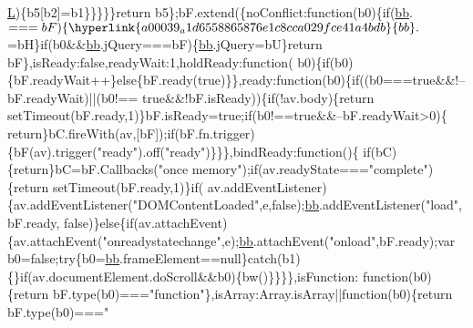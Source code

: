 \begin{DoxyCode}
      \hyperlink{a00039_a38ee4c0b5f4fe2a18d0c783af540d253}{L})\{b5[b2]=b1\}\}\}\}\}\textcolor{keywordflow}{return} b5\};bF.extend(\{noConflict:\textcolor{keyword}{function}(b0)\{\textcolor{keywordflow}{if}(\hyperlink{a00039_a1d6558865876e1c8cca029fce41a4bdb}{bb}.$===bF)\{
      \hyperlink{a00039_a1d6558865876e1c8cca029fce41a4bdb}{bb}.$=bH\}\textcolor{keywordflow}{if}(b0&&\hyperlink{a00039_a1d6558865876e1c8cca029fce41a4bdb}{bb}.jQuery===bF)\{\hyperlink{a00039_a1d6558865876e1c8cca029fce41a4bdb}{bb}.jQuery=bU\}\textcolor{keywordflow}{return} bF\},isReady:\textcolor{keyword}{false},readyWait:1,holdReady:\textcolor{keyword}{function}(
      b0)\{\textcolor{keywordflow}{if}(b0)\{bF.readyWait++\}\textcolor{keywordflow}{else}\{bF.ready(\textcolor{keyword}{true})\}\},ready:\textcolor{keyword}{function}(b0)\{\textcolor{keywordflow}{if}((b0===\textcolor{keyword}{true}&&!--bF.readyWait)||(b0!==\textcolor{keyword}{
      true}&&!bF.isReady))\{\textcolor{keywordflow}{if}(!av.body)\{\textcolor{keywordflow}{return} setTimeout(bF.ready,1)\}bF.isReady=\textcolor{keyword}{true};\textcolor{keywordflow}{if}(b0!==\textcolor{keyword}{true}&&--bF.readyWait>0)\{\textcolor{keywordflow}{
      return}\}bC.fireWith(av,[bF]);\textcolor{keywordflow}{if}(bF.fn.trigger)\{bF(av).trigger(\textcolor{stringliteral}{"ready"}).off(\textcolor{stringliteral}{"ready"})\}\}\},bindReady:\textcolor{keyword}{function}()\{\textcolor{keywordflow}{
      if}(bC)\{\textcolor{keywordflow}{return}\}bC=bF.Callbacks(\textcolor{stringliteral}{"once memory"});\textcolor{keywordflow}{if}(av.readyState===\textcolor{stringliteral}{"complete"})\{\textcolor{keywordflow}{return} setTimeout(bF.ready,1)\}\textcolor{keywordflow}{if}(
      av.addEventListener)\{av.addEventListener(\textcolor{stringliteral}{"DOMContentLoaded"},e,\textcolor{keyword}{false});\hyperlink{a00039_a1d6558865876e1c8cca029fce41a4bdb}{bb}.addEventListener(\textcolor{stringliteral}{"load"},bF.ready,\textcolor{keyword}{
      false})\}\textcolor{keywordflow}{else}\{\textcolor{keywordflow}{if}(av.attachEvent)\{av.attachEvent(\textcolor{stringliteral}{"onreadystatechange"},e);\hyperlink{a00039_a1d6558865876e1c8cca029fce41a4bdb}{bb}.attachEvent(\textcolor{stringliteral}{"onload"},bF.ready);var
       b0=\textcolor{keyword}{false};\textcolor{keywordflow}{try}\{b0=\hyperlink{a00039_a1d6558865876e1c8cca029fce41a4bdb}{bb}.frameElement==null\}\textcolor{keywordflow}{catch}(b1)\{\}\textcolor{keywordflow}{if}(av.documentElement.doScroll&&b0)\{bw()\}\}\}\},isFunction:\textcolor{keyword}{
      function}(b0)\{\textcolor{keywordflow}{return} bF.type(b0)===\textcolor{stringliteral}{"function"}\},isArray:Array.isArray||\textcolor{keyword}{function}(b0)\{\textcolor{keywordflow}{return} bF.type(b0)===\textcolor{stringliteral}{"
}
\end{DoxyCode}
